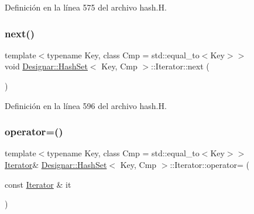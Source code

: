 Definición en la línea 575 del archivo hash.\+H.

\mbox{\label{class_designar_1_1_hash_set_1_1_iterator_a13eaec913faa009d4d002c25965d67d7}} 
\subsubsection{\texorpdfstring{next()}{next()}}
{\footnotesize\ttfamily template$<$typename Key, class Cmp = std\+::equal\+\_\+to$<$\+Key$>$$>$ \\
void \hyperlink{class_designar_1_1_hash_set}{Designar\+::\+Hash\+Set}$<$ Key, Cmp $>$\+::Iterator\+::next (\begin{DoxyParamCaption}{ }\end{DoxyParamCaption})\hspace{0.3cm}{\ttfamily [inline]}}



Definición en la línea 596 del archivo hash.\+H.

\mbox{\label{class_designar_1_1_hash_set_1_1_iterator_a8e8fce4e60beb6933dd5d13b39d67493}} 
\subsubsection{\texorpdfstring{operator=()}{operator=()}\hspace{0.1cm}{\footnotesize\ttfamily [1/2]}}
{\footnotesize\ttfamily template$<$typename Key, class Cmp = std\+::equal\+\_\+to$<$\+Key$>$$>$ \\
\hyperlink{class_designar_1_1_hash_set_1_1_iterator}{Iterator}\& \hyperlink{class_designar_1_1_hash_set}{Designar\+::\+Hash\+Set}$<$ Key, Cmp $>$\+::Iterator\+::operator= (\begin{DoxyParamCaption}\item[{const \hyperlink{class_designar_1_1_hash_set_1_1_iterator}{Iterator} \&}]{it }\end{DoxyParamCaption})\hspace{0.3cm}{\ttfamily [inline]}}



